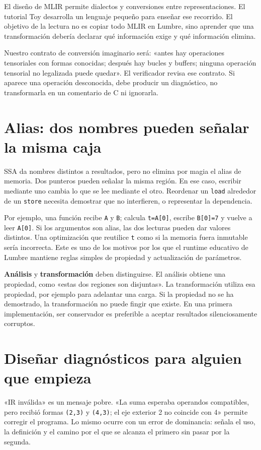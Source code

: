 \documentclass[12pt,a4paper,oneside]{report}
\begin{document}
El diseño de MLIR permite dialectos y conversiones entre representaciones. El tutorial Toy desarrolla un lenguaje pequeño para enseñar ese recorrido. El objetivo de la lectura no es copiar todo MLIR en Lumbre, sino aprender que una transformación debería declarar qué información exige y qué información elimina. \cite{mlir-toy,mlir-paper}

Nuestro contrato de conversión imaginario será: «antes hay operaciones tensoriales con formas conocidas; después hay bucles y buffers; ninguna operación tensorial no legalizada puede quedar». El verificador revisa ese contrato. Si aparece una operación desconocida, debe producir un diagnóstico, no transformarla en un comentario de C ni ignorarla.

\section{Alias: dos nombres pueden señalar la misma caja}
SSA da nombres distintos a resultados, pero no elimina por magia el alias de memoria. Dos punteros pueden señalar la misma región. En ese caso, escribir mediante uno cambia lo que se lee mediante el otro. Reordenar un \texttt{load} alrededor de un \texttt{store} necesita demostrar que no interfieren, o representar la dependencia.

Por ejemplo, una función recibe \texttt{A} y \texttt{B}; calcula \texttt{t=A[0]}, escribe \texttt{B[0]=7} y vuelve a leer \texttt{A[0]}. Si los argumentos son alias, las dos lecturas pueden dar valores distintos. Una optimización que reutilice \texttt{t} como si la memoria fuera inmutable sería incorrecta. Este es uno de los motivos por los que el runtime educativo de Lumbre mantiene reglas simples de propiedad y actualización de parámetros.

\textbf{Análisis} y \textbf{transformación} deben distinguirse. El análisis obtiene una propiedad, como «estas dos regiones son disjuntas». La transformación utiliza esa propiedad, por ejemplo para adelantar una carga. Si la propiedad no se ha demostrado, la transformación no puede fingir que existe. En una primera implementación, ser conservador es preferible a aceptar resultados silenciosamente corruptos.

\section{Diseñar diagnósticos para alguien que empieza}
«IR inválida» es un mensaje pobre. «La suma esperaba operandos compatibles, pero recibió formas \texttt{(2,3)} y \texttt{(4,3)}; el eje exterior 2 no coincide con 4» permite corregir el programa. Lo mismo ocurre con un error de dominancia: señala el uso, la definición y el camino por el que se alcanza el primero sin pasar por la segunda.
\end{document}
